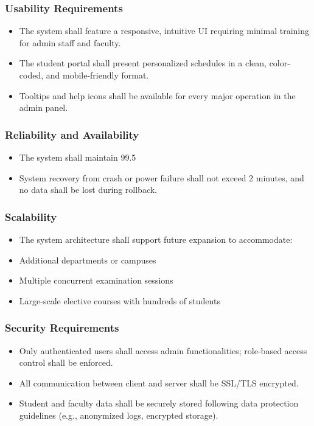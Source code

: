\documentclass[a4paper,12pt]{article}
\begin{document}
\subsubsection{Usability Requirements}
\begin{itemize}
\item The system shall feature a responsive, intuitive UI requiring minimal training for admin staff and faculty.

\item The student portal shall present personalized schedules in a clean, color-coded, and mobile-friendly format.

\item Tooltips and help icons shall be available for every major operation in the admin panel.
\end{itemize}

\subsubsection{Reliability and Availability}
\begin{itemize}
\item The system shall maintain 99.5 %

\item System recovery from crash or power failure shall not exceed 2 minutes, and no data shall be lost during rollback.
\end{itemize}

\subsubsection{Scalability}
\begin{itemize}
\item The system architecture shall support future expansion to accommodate:

\item Additional departments or campuses

\item Multiple concurrent examination sessions

\item Large-scale elective courses with hundreds of students
\end{itemize}

\subsubsection{Security Requirements}
\begin{itemize}
\item Only authenticated users shall access admin functionalities; role-based access control shall be enforced.

\item All communication between client and server shall be SSL/TLS encrypted.

\item Student and faculty data shall be securely stored following data protection guidelines (e.g., anonymized logs, encrypted storage).
\end{itemize}
\end{document}
